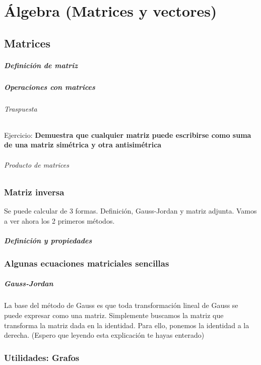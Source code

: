 \chapter{Álgebra (Matrices y vectores)}

\section{Matrices}

\paragraph{Definición de matriz}

\paragraph{Operaciones con matrices}

\subparagraph{Traspuesta}

Ejercicio: \textbf{Demuestra que cualquier matriz puede escribirse como suma de una matriz simétrica y otra antisimétrica}

\subparagraph{Producto de matrices}

\subsection{Matriz inversa}
Se puede calcular de 3 formas. Definición, Gauss-Jordan y matriz adjunta. Vamos a ver ahora los 2 primeros métodos.

\paragraph{Definición y propiedades}

\subsection{Algunas ecuaciones matriciales sencillas}

\paragraph{Gauss-Jordan}
La base del método de Gauss es que toda transformación lineal de Gauss se puede expresar como una matriz. Simplemente buscamos la matriz que transforma la matriz dada en la identidad. Para ello, ponemos la identidad a la derecha. (Espero que leyendo esta explicación te hayas enterado)


\subsection{Utilidades: Grafos}

